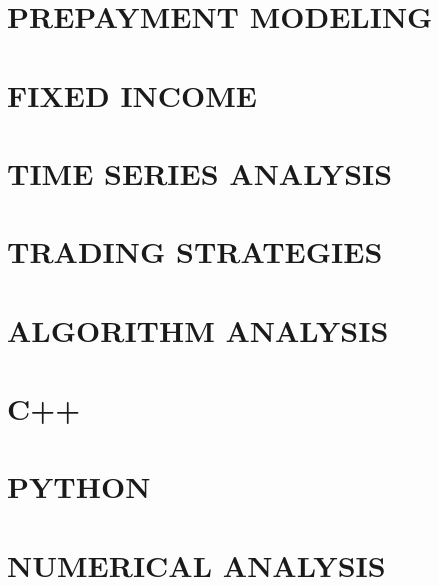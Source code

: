 \documentclass[a4paper]{article}
\begin{document}
\section*{PREPAYMENT MODELING}
\begin{enumerate}
\end{enumerate}

\section*{FIXED INCOME}
\begin{enumerate}
\end{enumerate}


\section*{TIME SERIES ANALYSIS}
\begin{enumerate}
\end{enumerate}

\section*{TRADING STRATEGIES}
\begin{enumerate}
\end{enumerate}


\section*{ALGORITHM ANALYSIS}
\begin{enumerate}
\end{enumerate}

\section*{C++}
\begin{enumerate}
\end{enumerate}

\section*{PYTHON}
\begin{enumerate}
\end{enumerate}

\section*{NUMERICAL ANALYSIS}
\begin{enumerate}
\end{enumerate}
\end{document}
